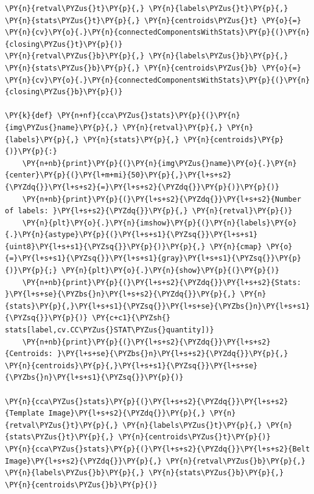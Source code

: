 \documentclass[a4paper,11pt]{article}%
\begin{document}
    \begin{tcolorbox}[breakable, size=fbox, boxrule=1pt, pad at break*=1mm,colback=cellbackground, colframe=cellborder]
\begin{Verbatim}[commandchars=\\\{\}]
\PY{n}{retval\PYZus{}t}\PY{p}{,} \PY{n}{labels\PYZus{}t}\PY{p}{,} \PY{n}{stats\PYZus{}t}\PY{p}{,} \PY{n}{centroids\PYZus{}t} \PY{o}{=} \PY{n}{cv}\PY{o}{.}\PY{n}{connectedComponentsWithStats}\PY{p}{(}\PY{n}{closing\PYZus{}t}\PY{p}{)}
\PY{n}{retval\PYZus{}b}\PY{p}{,} \PY{n}{labels\PYZus{}b}\PY{p}{,} \PY{n}{stats\PYZus{}b}\PY{p}{,} \PY{n}{centroids\PYZus{}b} \PY{o}{=} \PY{n}{cv}\PY{o}{.}\PY{n}{connectedComponentsWithStats}\PY{p}{(}\PY{n}{closing\PYZus{}b}\PY{p}{)}

\PY{k}{def} \PY{n+nf}{cca\PYZus{}stats}\PY{p}{(}\PY{n}{img\PYZus{}name}\PY{p}{,} \PY{n}{retval}\PY{p}{,} \PY{n}{labels}\PY{p}{,} \PY{n}{stats}\PY{p}{,} \PY{n}{centroids}\PY{p}{)}\PY{p}{:}
    \PY{n+nb}{print}\PY{p}{(}\PY{n}{img\PYZus{}name}\PY{o}{.}\PY{n}{center}\PY{p}{(}\PY{l+m+mi}{50}\PY{p}{,}\PY{l+s+s2}{\PYZdq{}}\PY{l+s+s2}{=}\PY{l+s+s2}{\PYZdq{}}\PY{p}{)}\PY{p}{)}
    \PY{n+nb}{print}\PY{p}{(}\PY{l+s+s2}{\PYZdq{}}\PY{l+s+s2}{Number of labels: }\PY{l+s+s2}{\PYZdq{}}\PY{p}{,} \PY{n}{retval}\PY{p}{)}
    \PY{n}{plt}\PY{o}{.}\PY{n}{imshow}\PY{p}{(}\PY{n}{labels}\PY{o}{.}\PY{n}{astype}\PY{p}{(}\PY{l+s+s1}{\PYZsq{}}\PY{l+s+s1}{uint8}\PY{l+s+s1}{\PYZsq{}}\PY{p}{)}\PY{p}{,} \PY{n}{cmap} \PY{o}{=}\PY{l+s+s1}{\PYZsq{}}\PY{l+s+s1}{gray}\PY{l+s+s1}{\PYZsq{}}\PY{p}{)}\PY{p}{;} \PY{n}{plt}\PY{o}{.}\PY{n}{show}\PY{p}{(}\PY{p}{)}
    \PY{n+nb}{print}\PY{p}{(}\PY{l+s+s2}{\PYZdq{}}\PY{l+s+s2}{Stats: }\PY{l+s+se}{\PYZbs{}n}\PY{l+s+s2}{\PYZdq{}}\PY{p}{,} \PY{n}{stats}\PY{p}{,}\PY{l+s+s1}{\PYZsq{}}\PY{l+s+se}{\PYZbs{}n}\PY{l+s+s1}{\PYZsq{}}\PY{p}{)} \PY{c+c1}{\PYZsh{} stats[label,cv.CC\PYZus{}STAT\PYZus{}quantity])}
    \PY{n+nb}{print}\PY{p}{(}\PY{l+s+s2}{\PYZdq{}}\PY{l+s+s2}{Centroids: }\PY{l+s+se}{\PYZbs{}n}\PY{l+s+s2}{\PYZdq{}}\PY{p}{,} \PY{n}{centroids}\PY{p}{,}\PY{l+s+s1}{\PYZsq{}}\PY{l+s+se}{\PYZbs{}n}\PY{l+s+s1}{\PYZsq{}}\PY{p}{)}

\PY{n}{cca\PYZus{}stats}\PY{p}{(}\PY{l+s+s2}{\PYZdq{}}\PY{l+s+s2}{Template Image}\PY{l+s+s2}{\PYZdq{}}\PY{p}{,} \PY{n}{retval\PYZus{}t}\PY{p}{,} \PY{n}{labels\PYZus{}t}\PY{p}{,} \PY{n}{stats\PYZus{}t}\PY{p}{,} \PY{n}{centroids\PYZus{}t}\PY{p}{)}
\PY{n}{cca\PYZus{}stats}\PY{p}{(}\PY{l+s+s2}{\PYZdq{}}\PY{l+s+s2}{Belt Image}\PY{l+s+s2}{\PYZdq{}}\PY{p}{,} \PY{n}{retval\PYZus{}b}\PY{p}{,} \PY{n}{labels\PYZus{}b}\PY{p}{,} \PY{n}{stats\PYZus{}b}\PY{p}{,} \PY{n}{centroids\PYZus{}b}\PY{p}{)}
\end{Verbatim}
\end{tcolorbox}
\end{document}
